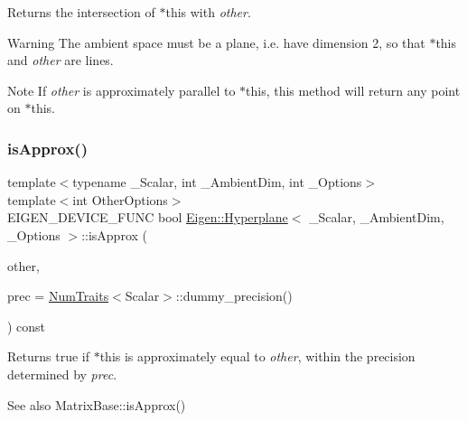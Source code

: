\begin{DoxyReturn}{Returns}
the intersection of $\ast$this with {\itshape other}.
\end{DoxyReturn}
\begin{DoxyWarning}{Warning}
The ambient space must be a plane, i.\+e. have dimension 2, so that {\ttfamily $\ast$this} and {\itshape other} are lines.
\end{DoxyWarning}
\begin{DoxyNote}{Note}
If {\itshape other} is approximately parallel to $\ast$this, this method will return any point on $\ast$this. 
\end{DoxyNote}
\mbox{\label{class_eigen_1_1_hyperplane_a544f8466e85e4b95e1848dccf6015d23}} 
\subsubsection{\texorpdfstring{isApprox()}{isApprox()}}
{\footnotesize\ttfamily template$<$typename \+\_\+\+Scalar, int \+\_\+\+Ambient\+Dim, int \+\_\+\+Options$>$ \\
template$<$int Other\+Options$>$ \\
E\+I\+G\+E\+N\+\_\+\+D\+E\+V\+I\+C\+E\+\_\+\+F\+U\+NC bool \mbox{\hyperlink{class_eigen_1_1_hyperplane}{Eigen\+::\+Hyperplane}}$<$ \+\_\+\+Scalar, \+\_\+\+Ambient\+Dim, \+\_\+\+Options $>$\+::is\+Approx (\begin{DoxyParamCaption}\item[{const \mbox{\hyperlink{class_eigen_1_1_hyperplane}{Hyperplane}}$<$ Scalar, Ambient\+Dim\+At\+Compile\+Time, Other\+Options $>$ \&}]{other,  }\item[{const typename \mbox{\hyperlink{struct_eigen_1_1_num_traits}{Num\+Traits}}$<$ Scalar $>$\+::Real \&}]{prec = {\ttfamily \mbox{\hyperlink{struct_eigen_1_1_num_traits}{Num\+Traits}}$<$Scalar$>$\+:\+:dummy\+\_\+precision()} }\end{DoxyParamCaption}) const\hspace{0.3cm}{\ttfamily [inline]}}

\begin{DoxyReturn}{Returns}
{\ttfamily true} if {\ttfamily $\ast$this} is approximately equal to {\itshape other}, within the precision determined by {\itshape prec}.
\end{DoxyReturn}
\begin{DoxySeeAlso}{See also}
Matrix\+Base\+::is\+Approx() 
\end{DoxySeeAlso}
\mbox{\label{class_eigen_1_1_hyperplane_ad3da930fc7025604f2f174651089b2a8}} 
